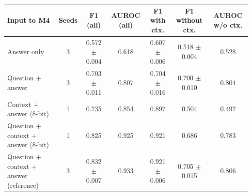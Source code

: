 \begin{tabular}{@{}lcccccc@{}}
\toprule
Input to M4 & Seeds & F1 (all) & AUROC (all) & F1 with ctx. & F1 without ctx. & AUROC w/o ctx. \\
\midrule
Answer only & 3 & 0.572 $\pm$ 0.004 & 0.618 & 0.607 $\pm$ 0.006 & 0.518 $\pm$ 0.004 & 0.528 \\
Question + answer & 3 & 0.703 $\pm$ 0.011 & 0.807 & 0.704 $\pm$ 0.016 & 0.700 $\pm$ 0.010 & 0.804 \\
Context + answer (8-bit) & 1 & 0.735 & 0.854 & 0.897 & 0.504 & 0.497 \\
Question + context + answer (8-bit) & 1 & 0.825 & 0.925 & 0.921 & 0.686 & 0.783 \\
\midrule
Question + context + answer (reference) & 3 & 0.832 $\pm$ 0.007 & 0.933 & 0.921 $\pm$ 0.006 & 0.705 $\pm$ 0.015 & 0.806 \\
\bottomrule
\end{tabular}